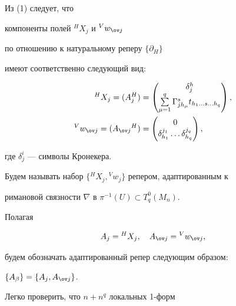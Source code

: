 Из (1) следует, что


компоненты полей ${}^HX_j$ и ${}^Vw_{{\ov j}}$


по отношению к натуральному реперу $\{\partial_H\}$


имеют соответственно следующий вид:


\begin{align*}


{}^HX_j=(A^H_j)&=\begin{pmatrix}


\delta^h_j \\ \sum\limits^q_{\mu=1}


\Gamma^s_{jh_\mu}t_{h_1\dotsc s\dotsc h_q}


\end{pmatrix}


, \\


%


{}^Vw_{{\ov j}}=(A_{{\ov j}}{}^H)&=\begin{pmatrix}


0 \\ \delta^{j_1}_{h_1}\dotsc \delta^{j_q}_{h_q}


\end{pmatrix},


\end{align*}


где $\delta^i_j$ --- символы Кронекера.


Будем называть набор $\{{}^HX_j,{}^Vw_j\}$ репером, адаптированным к


римановой связности $\nabla$ в $\pi^{-1}(U)\subset T^0_q(M_n)$.


Полагая


$$


A_j={}^HX_j,\quad A_{{\ov j}}={}^Vw_{{\ov j}},


$$


будем обозначать адаптированный репер следующим образом:


$\{A_\beta\}=\{A_j,A_{{\ov j}}\}$.





Легко проверить, что  $n+n^q$ локальных 1-форм


